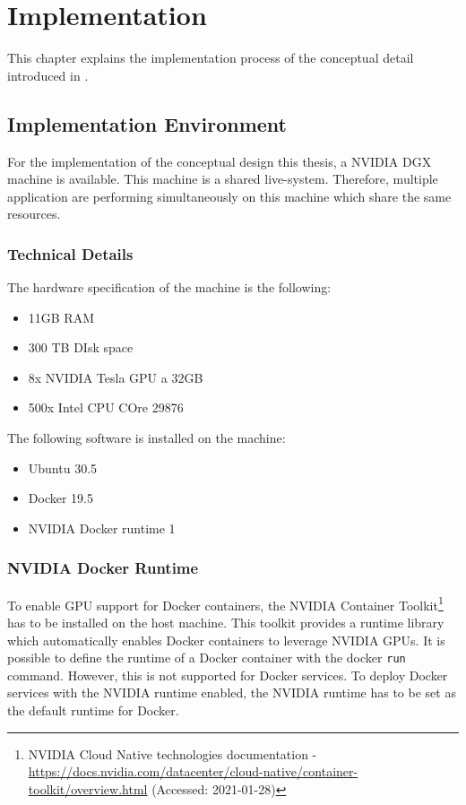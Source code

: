 \chapter{Implementation}
\label{chap:06_implementation}

This chapter explains the implementation process of the conceptual detail introduced in .


\section{Implementation Environment}
For the implementation of the conceptual design this thesis, a NVIDIA DGX machine is available. 
This machine is a shared live-system. Therefore, multiple application are performing simultaneously on this machine which share the same resources.


\subsection{Technical Details}
The hardware specification of the machine is the following:
\begin{itemize}
\item 11GB RAM
\item 300 TB DIsk space 
\item 8x NVIDIA Tesla GPU a 32GB
\item 500x Intel CPU COre 29876
\end{itemize}


The following software is installed on the machine:
\begin{itemize}
\item Ubuntu 30.5
\item Docker 19.5
\item NVIDIA Docker runtime 1
\end{itemize}


\subsection{NVIDIA Docker Runtime}
To enable GPU support for Docker containers, the NVIDIA Container Toolkit\footnote{NVIDIA Cloud Native technologies documentation - \url{https://docs.nvidia.com/datacenter/cloud-native/container-toolkit/overview.html} (Accessed: 2021-01-28)} has to be installed on the host machine. This toolkit provides a runtime library which automatically enables Docker containers to leverage NVIDIA GPUs.
It is possible to define the runtime of a Docker container with the docker \texttt{run} command. However, this is not supported for Docker services. To deploy Docker services with the NVIDIA runtime enabled, the NVIDIA runtime has to be set as the default runtime for Docker.

